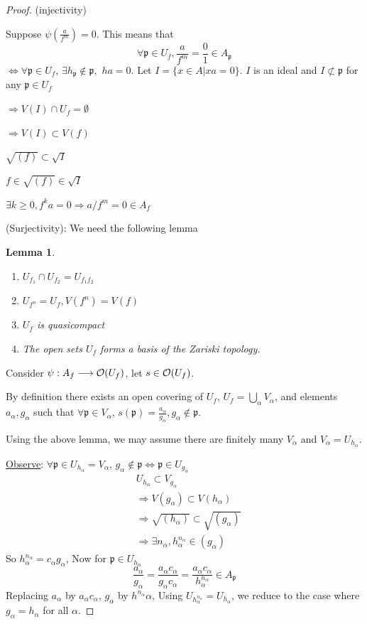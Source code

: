 \documentclass[11pt]{article}
\newtheorem{lemma}[thm]{Lemma}
\newcommand{\scp}{{\mathfrak p}}
\newcommand{\calo}{{\cal O}}
\newcommand{\notsubset}{\not \subset}
\newcommand{\Lrta}{\Longrightarrow}
\newcommand{\lrta}{\longrightarrow}
\newcommand{\Llrta}{\Longleftrightarrow}
\begin{document}
\begin{proof}
(injectivity)

Suppose $\psi\left(\frac{a}{f^m}\right)=0$. This means that 
$$
\forall \scp\in U_f, \frac{a}{f^m}=\frac{0}{1}\in A_\scp
$$
$\Llrta \forall \scp\in U_f$, $\exists h_\scp\notin \scp,$ $ha=0$. Let $I=\{x\in A|xa=0\}$. $I$ is an ideal and $I\notsubset \scp$ for any $\scp \in U_f$

$\Lrta V(I)\cap U_f=\emptyset$

$\Lrta V(I)\subset V(f)$

$\sqrt{(f)}\subset \sqrt{I}$

$f\in \sqrt{(f)}\in\sqrt{I}$

$\exists k\geq 0, f^ka=0\Lrta a/f^m=0\in A_f$

(Surjectivity): We need the following lemma
\begin{lemma}\ 
\begin{enumerate}[label=(\arabic*)]
\item $U_{f_1}\cap U_{f_2}=U_{f_1f_2}$
\item $U_{f^n}=U_{f}, V(f^n)=V(f)$
\item $U_f$ is quasicompact
\item The open sets $U_f$ forms a basis of the Zariski topology.
\end{enumerate}
\end{lemma}
Consider $\psi:A_f\lrta \calo(U_f)$, let $s\in \calo(U_f)$.

By definition there exists an open covering of $U_f$, $U_f=\bigcup_\alpha V_\alpha$, and elements $a_\alpha, g_\alpha$ such that $\forall \scp\in V_\alpha$, $s(\scp)=\frac{a_\alpha}{g_\alpha}, g_\alpha\notin \scp$.

Using the above lemma,  we may assume  there are finitely many $V_\alpha$ and $V_\alpha=U_{h_\alpha}$.

\underline{Observe}: $\forall \scp\in U_{h_\alpha}=V_\alpha$, $g_\alpha\notin\scp\Llrta \scp\in U_{g_\alpha}$
$$
\begin{aligned}
&U_{h_\alpha}\subset V_{g_\alpha}\\
& \Lrta V(g_\alpha)\subset V(h_\alpha)\\
&\Lrta \sqrt{(h_\alpha)}\subset \sqrt{(g_\alpha)}\\
&\Lrta \exists n_\alpha, h^{n_\alpha}_{\alpha}\in (g_{\alpha})
\end{aligned}
$$
So $h^{n_\alpha}_\alpha=c_\alpha g_\alpha$, Now for $\scp\in U_{h_\alpha}$
$$
\frac{a_\alpha}{g_\alpha}=\frac{a_\alpha c_\alpha }{g_\alpha c_\alpha}=\frac{a_\alpha c_\alpha}{h_\alpha^{n_\alpha}}\in A_\scp
$$
Replacing $a_\alpha$ by $a_\alpha c_\alpha$, $g_\alpha$ by $h^{n_\alpha}{\alpha}$, Using $U_{h_\alpha^{n_\alpha}}=U_{h_\alpha}$, we reduce to the case where $g_\alpha=h_\alpha$ for all $\alpha$.


\end{proof}
\end{document}
